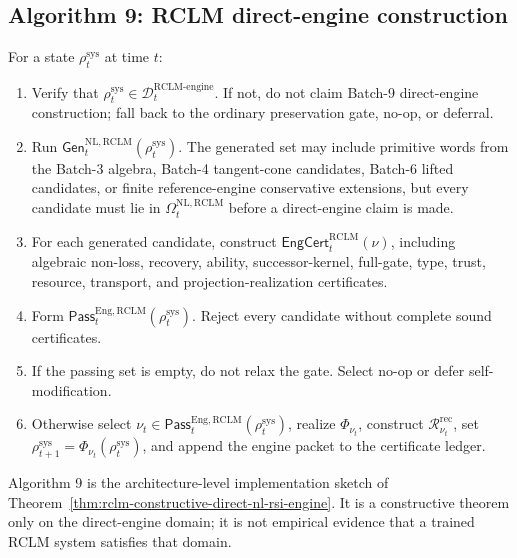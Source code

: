 \documentclass[11pt,a4paper]{article}
\newcommand{\Dcal}{\mathcal D}
\newcommand{\RCLM}{\mathrm{RCLM}}
\newcommand{\sys}{\mathrm{sys}}
\newcommand{\rec}{\mathrm{rec}}
\newcommand{\engine}{\mathrm{engine}}
\newcommand{\NL}{\mathrm{NL}}
\newcommand{\Eng}{\mathrm{Eng}}
\begin{document}
\subsection*{Algorithm 9: RCLM direct-engine construction}
\label{alg:rclm-direct-engine-construction}
For a state \(\rho_t^{\sys}\) at time \(t\):
\begin{enumerate}[leftmargin=1.5em]
    \item Verify that \(\rho_t^{\sys}\in\Dcal_t^{\RCLM\text{-}\engine}\). If not, do not claim Batch-9 direct-engine construction; fall back to the ordinary preservation gate, no-op, or deferral.
    \item Run \(\mathsf{Gen}_t^{\NL,\RCLM}(\rho_t^{\sys})\). The generated set may include primitive words from the Batch-3 algebra, Batch-4 tangent-cone candidates, Batch-6 lifted candidates, or finite reference-engine conservative extensions, but every candidate must lie in \(\Omega_t^{\NL,\RCLM}\) before a direct-engine claim is made.
    \item For each generated candidate, construct \(\mathsf{EngCert}_t^{\RCLM}(\nu)\), including algebraic non-loss, recovery, ability, successor-kernel, full-gate, type, trust, resource, transport, and projection-realization certificates.
    \item Form \(\mathsf{Pass}_t^{\Eng,\RCLM}(\rho_t^{\sys})\). Reject every candidate without complete sound certificates.
    \item If the passing set is empty, do not relax the gate. Select no-op or defer self-modification.
    \item Otherwise select \(\nu_t\in\mathsf{Pass}_t^{\Eng,\RCLM}(\rho_t^{\sys})\), realize \(\Phi_{\nu_t}\), construct \(\mathcal R_{\nu_t}^{\rec}\), set \(\rho_{t+1}^{\sys}=\Phi_{\nu_t}(\rho_t^{\sys})\), and append the engine packet to the certificate ledger.
\end{enumerate}
Algorithm 9 is the architecture-level implementation sketch of Theorem~\ref{thm:rclm-constructive-direct-nl-rsi-engine}. It is a constructive theorem only on the direct-engine domain; it is not empirical evidence that a trained RCLM system satisfies that domain.
\end{document}
